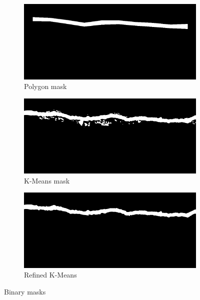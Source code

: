 \begin{figure}[ht]
    \centering
    \begin{subfigure}{0.3\textwidth}
        \centering
        \includegraphics[width=\linewidth]{PICTURES/MASK/316L_W_3500h_low_cross_strana1_07(2).png}
        \caption{Polygon mask}
        \label{fig:polygon_sem}
    \end{subfigure}
    \hfill
    \begin{subfigure}{0.3\textwidth}
        \centering
        \includegraphics[width=\linewidth]{PICTURES/MASK/316L_W_3500h_low_cross_strana1_07.png}
        \caption{K-Means mask}
        \label{fig:kmean_sem}
    \end{subfigure}
    \hfill
    \begin{subfigure}{0.3\textwidth}
        \centering
        \includegraphics[width=\linewidth]{PICTURES/MASK/316L_W_3500h_low_cross_strana1_07(1).png}
        \caption{Refined K-Means}
        \label{fig:kmean_refined_sem}
    \end{subfigure}
    \caption{Binary masks}
    \label{fig:three-masks}
\end{figure}
